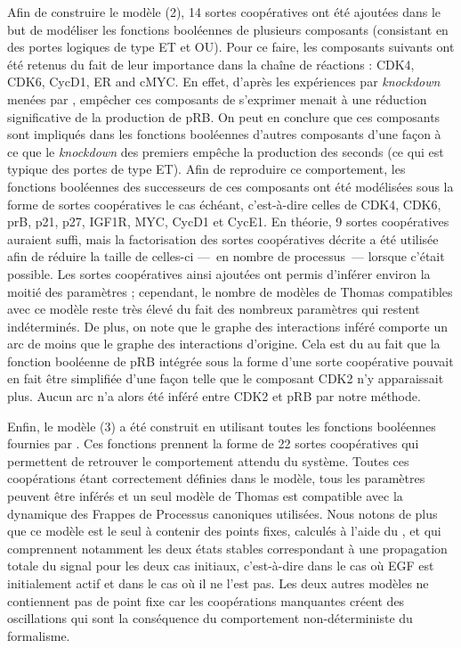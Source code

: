 Afin de construire le modèle (2), 14 sortes coopératives ont été ajoutées dans le but de
modéliser les fonctions booléennes de plusieurs composants (consistant en des portes logiques
de type ET et OU).
Pour ce faire, les composants suivants ont été retenus du fait de leur importance dans la
chaîne de réactions : CDK4, CDK6, CycD1, ER\nbd \textalpha{} and c\nbd MYC.
En effet, d'après les expériences par \textit{knockdown} menées par ,
empêcher ces composants de s'exprimer menait à une réduction significative de la production
de pRB.
On peut en conclure que ces composants sont impliqués dans les fonctions booléennes
d'autres composants d'une façon à ce que le \textit{knockdown} des premiers
empêche la production des seconds (ce qui est typique des portes de type ET).
Afin de reproduire ce comportement, les fonctions booléennes des successeurs de ces composants
ont été modélisées sous la forme de sortes coopératives le cas échéant, c'est-à-dire celles de
CDK4, CDK6, prB, p21, p27, IGF1R, MYC, CycD1 et CycE1.
En théorie, 9 sortes coopératives auraient suffi, mais la factorisation des sortes coopératives
décrite  a été utilisée afin de réduire la taille de celles-ci
---~en nombre de processus~--- lorsque c'était possible.
Les sortes coopératives ainsi ajoutées ont permis d'inférer environ la moitié des paramètres ;
cependant, le nombre de modèles de Thomas compatibles avec ce modèle reste très élevé
du fait des nombreux paramètres qui restent indéterminés.
De plus, on note que le graphe des interactions inféré comporte un arc de moins que
le graphe des interactions d'origine.
Cela est du au fait que la fonction booléenne de pRB intégrée sous la forme
d'une sorte coopérative pouvait en fait être simplifiée
d'une façon telle que le composant CDK2 n'y apparaissait plus.
Aucun arc n'a alors été inféré entre CDK2 et pRB par notre méthode.

Enfin, le modèle (3) a été construit en utilisant toutes les fonctions booléennes
fournies par .
Ces fonctions prennent la forme de 22 sortes coopératives qui permettent de retrouver
le comportement attendu du système.
Toutes ces coopérations étant correctement définies dans le modèle,
tous les paramètres peuvent être inférés et un seul modèle de Thomas est compatible
avec la dynamique des Frappes de Processus canoniques utilisées.
Nous notons de plus que ce modèle est le seul à contenir des points fixes,
calculés à l'aide du ,
et qui comprennent notamment les deux états stables correspondant à une propagation
totale du signal pour les deux cas initiaux,
c'est-à-dire dans le cas où EGF est initialement actif et dans le cas où il ne l'est pas.
Les deux autres modèles ne contiennent pas de point fixe car les coopérations manquantes
créent des oscillations qui sont la conséquence du comportement non-déterministe
du formalisme.

